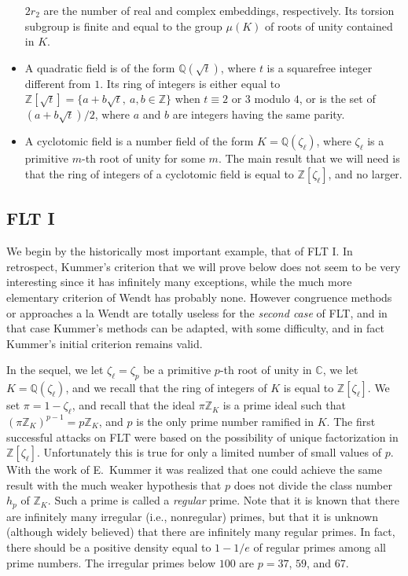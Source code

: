 \documentclass[12pt,a4paper]{article}
\newcommand{\Q}{{\mathbb Q}}
\newcommand{\Z}{{\mathbb Z}}
\newcommand{\C}{{\mathbb C}}
\newcommand{\z}{{\zeta_\ell}}
\begin{document}
\begin{itemize}
$2r_2$ are the number of real and complex embeddings, respectively. Its
torsion subgroup is finite and equal to the group $\mu(K)$ of roots of unity
contained in $K$.
\item A quadratic field is of the form $\Q(\sqrt{t})$, where $t$ is a
squarefree integer different from $1$. Its ring of integers is either
equal to $\Z[\sqrt{t}]=\{a+b\sqrt{t},\ a,b\in\Z\}$ when $t\equiv2$ or $3$
modulo $4$, or is the set of $(a+b\sqrt{t})/2$, where $a$ and $b$ are
integers having the same parity.
\item A cyclotomic field is a number field of the form $K=\Q(\z)$, where
$\z$ is a primitive $m$-th root of unity for some $m$. The main result
that we will need is that the ring of integers of a cyclotomic field is
equal to $\Z[\z]$, and no larger.\end{itemize}

\subsection{FLT I}

We begin by the historically most important example, that of FLT I. In
retrospect, Kummer's criterion that we will prove below does not seem to be 
very interesting since it has infinitely many exceptions, while
the much more elementary criterion of Wendt has probably none. However
congruence methods or approaches a la Wendt are totally useless for the
\emph{second case} of FLT, and in that case Kummer's methods can be adapted,
with some difficulty, and in fact Kummer's initial criterion remains valid.

\smallskip

In the sequel, we let $\z=\zeta_p$ be a primitive $p$-th root of unity in $\C$,
we let $K=\Q(\z)$, and we recall that the ring of integers of $K$ is equal to
$\Z[\z]$. We set $\pi=1-\z$, and recall that the ideal $\pi\Z_K$ is a prime
ideal such that $(\pi\Z_K)^{p-1}=p\Z_K$, and $p$ is the only prime number
ramified in $K$. The first successful attacks on FLT were based on the 
possibility of unique factorization in $\Z[\z]$. Unfortunately this is true for
only a limited number of small values of $p$. With the work of E.~Kummer it was
realized that one could achieve the same result with the much weaker hypothesis
that $p$ does not divide the class number $h_p$ of $\Z_K$.
Such a prime is called a \emph{regular} prime.
Note that it is known that there are infinitely many irregular (i.e., 
nonregular) primes, but that it is unknown 
(although widely believed) that there are infinitely many regular primes. In 
fact, there should be a positive density equal to $1-1/e$ of regular primes 
among all prime numbers. The irregular primes below $100$ are $p=37$, $59$, 
and $67$.
\end{document}
